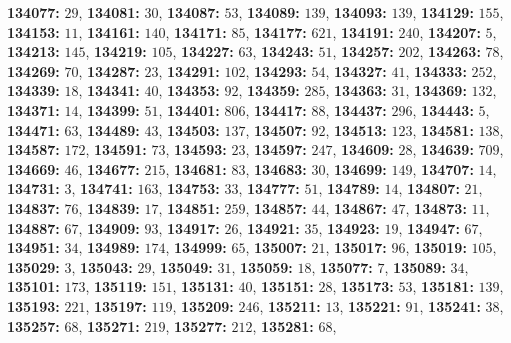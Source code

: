 \textsf{\bfseries 134077:} $29$, \textsf{\bfseries 134081:} $30$, \textsf{\bfseries 134087:} $53$, \textsf{\bfseries 134089:} $139$, \textsf{\bfseries 134093:} $139$, \textsf{\bfseries 134129:} $155$, \textsf{\bfseries 134153:} $11$, \textsf{\bfseries 134161:} $140$, \textsf{\bfseries 134171:} $85$, \textsf{\bfseries 134177:} $621$, \textsf{\bfseries 134191:} $240$, \textsf{\bfseries 134207:} $5$, \textsf{\bfseries 134213:} $145$, \textsf{\bfseries 134219:} $105$, \textsf{\bfseries 134227:} $63$, \textsf{\bfseries 134243:} $51$, \textsf{\bfseries 134257:} $202$, \textsf{\bfseries 134263:} $78$, \textsf{\bfseries 134269:} $70$, \textsf{\bfseries 134287:} $23$, \textsf{\bfseries 134291:} $102$, \textsf{\bfseries 134293:} $54$, \textsf{\bfseries 134327:} $41$, \textsf{\bfseries 134333:} $252$, \textsf{\bfseries 134339:} $18$, \textsf{\bfseries 134341:} $40$, \textsf{\bfseries 134353:} $92$, \textsf{\bfseries 134359:} $285$, \textsf{\bfseries 134363:} $31$, \textsf{\bfseries 134369:} $132$, \textsf{\bfseries 134371:} $14$, \textsf{\bfseries 134399:} $51$, \textsf{\bfseries 134401:} $806$, \textsf{\bfseries 134417:} $88$, \textsf{\bfseries 134437:} $296$, \textsf{\bfseries 134443:} $5$, \textsf{\bfseries 134471:} $63$, \textsf{\bfseries 134489:} $43$, \textsf{\bfseries 134503:} $137$, \textsf{\bfseries 134507:} $92$, \textsf{\bfseries 134513:} $123$, \textsf{\bfseries 134581:} $138$, \textsf{\bfseries 134587:} $172$, \textsf{\bfseries 134591:} $73$, \textsf{\bfseries 134593:} $23$, \textsf{\bfseries 134597:} $247$, \textsf{\bfseries 134609:} $28$, \textsf{\bfseries 134639:} $709$, \textsf{\bfseries 134669:} $46$, \textsf{\bfseries 134677:} $215$, \textsf{\bfseries 134681:} $83$, \textsf{\bfseries 134683:} $30$, \textsf{\bfseries 134699:} $149$, \textsf{\bfseries 134707:} $14$, \textsf{\bfseries 134731:} $3$, \textsf{\bfseries 134741:} $163$, \textsf{\bfseries 134753:} $33$, \textsf{\bfseries 134777:} $51$, \textsf{\bfseries 134789:} $14$, \textsf{\bfseries 134807:} $21$, \textsf{\bfseries 134837:} $76$, \textsf{\bfseries 134839:} $17$, \textsf{\bfseries 134851:} $259$, \textsf{\bfseries 134857:} $44$, \textsf{\bfseries 134867:} $47$, \textsf{\bfseries 134873:} $11$, \textsf{\bfseries 134887:} $67$, \textsf{\bfseries 134909:} $93$, \textsf{\bfseries 134917:} $26$, \textsf{\bfseries 134921:} $35$, \textsf{\bfseries 134923:} $19$, \textsf{\bfseries 134947:} $67$, \textsf{\bfseries 134951:} $34$, \textsf{\bfseries 134989:} $174$, \textsf{\bfseries 134999:} $65$, \textsf{\bfseries 135007:} $21$, \textsf{\bfseries 135017:} $96$, \textsf{\bfseries 135019:} $105$, \textsf{\bfseries 135029:} $3$, \textsf{\bfseries 135043:} $29$, \textsf{\bfseries 135049:} $31$, \textsf{\bfseries 135059:} $18$, \textsf{\bfseries 135077:} $7$, \textsf{\bfseries 135089:} $34$, \textsf{\bfseries 135101:} $173$, \textsf{\bfseries 135119:} $151$, \textsf{\bfseries 135131:} $40$, \textsf{\bfseries 135151:} $28$, \textsf{\bfseries 135173:} $53$, \textsf{\bfseries 135181:} $139$, \textsf{\bfseries 135193:} $221$, \textsf{\bfseries 135197:} $119$, \textsf{\bfseries 135209:} $246$, \textsf{\bfseries 135211:} $13$, \textsf{\bfseries 135221:} $91$, \textsf{\bfseries 135241:} $38$, \textsf{\bfseries 135257:} $68$, \textsf{\bfseries 135271:} $219$, \textsf{\bfseries 135277:} $212$, \textsf{\bfseries 135281:} $68$, 

